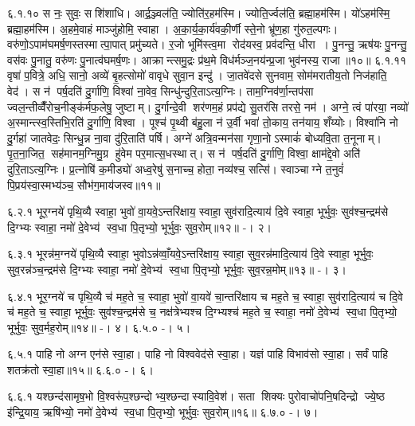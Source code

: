 ६.१.१०
स नः॒ सुवः॒ सशि॑शाधि। आर्द्र॒ञ्ज्वल॑ति॒ ज्योति॑र॒हम॑स्मि। ज्योति॒र्ज्वल॑ति॒ ब्रह्मा॒हम॑स्मि। यो॑ऽहम॑स्मि॒ ब्रह्मा॒हम॑स्मि। अ॒हमे॒वाहं माञ्जु॑होमि॒ स्वाहा। अ॒का॒र्य॒का॒र्य॑वकी॒र्णी स्ते॒नो भ्रू॑ण॒हा गु॑रुत॒ल्पगः। वरु॑णो॒ऽपाम॑घमर्\mbox{}ष॒णस्तस्मात्पा॒पात् प्रमु॑च्यते। र॒जो भूमि॑स्त्व॒मा रोद॑यस्व॒ प्रव॑दन्ति॒ धीरा। पु॒नन्तु॒ ऋष॑यः पु॒नन्तु॒ वस॑वः पु॒नातु॒ वरु॑णः पु॒नात्व॑घमर्\mbox{}ष॒णः। आक्रान्त्समु॒द्रः प्र॑थ॒मे विध॑र्मञ्ज॒नय॑न्प्र॒जा भुव॑नस्य॒ राजा॥१०॥
६.१.११
वृषा॑ प॒वित्रे॒ अधि॒ सानो॒ अव्ये॑ बृ॒हत्सोमो॑ वावृधे सुवा॒न इन्दु॑। जा॒तवे॑दसे सुनवाम॒ सोम॑मरातीय॒तो निज॑हाति॒ वेद॑। स न॑ पर्\mbox{}ष॒दति॑ दु॒र्गाणि॒ विश्वा॑ ना॒वेव॒ सिन्धु॑न्दुरि॒ताऽत्य॒ग्निः। ताम॒ग्निव॑र्णा॒न्तप॑सा ज्वल॒न्तीव्वैँ॑रोच॒नीङ्क॑र्मफ॒लेषु॒ जुष्टाम्। दु॒र्गान्दे॒वी शर॑णम॒हं प्रप॑द्ये सु॒तर॑सि तरसे॒ नम॑। अग्ने॒ त्वं पा॑रया॒ नव्यो॑ अ॒स्मान्त्स्व॒स्तिभि॒रति॑ दु॒र्गाणि॒ विश्वा। पूश्च॑ पृ॒थ्वी ब॑हु॒ला न॑ उ॒र्वी भवा॑ तो॒काय॒ तन॑याय॒ शँय्योः। विश्वा॑नि नो दु॒र्गहा॑ जातवेदः॒ सिन्धु॒न्न ना॒वा दु॑रि॒ताति॑ पर्\mbox{}षि। अग्ने॑ अत्रि॒वन्मन॑सा गृणा॒नोऽस्माकं॑ बोध्यवि॒ता त॒नूनाम्। पृ॒त॒ना॒जित॒ सह॑मानम॒ग्निमु॒ग्र हु॑वेम पर॒मात्स॒धस्थात्। स न॑ पर्\mbox{}ष॒दति॑ दु॒र्गाणि॒ विश्वा॒ क्षाम॑द्दे॒वो अति॑ दुरि॒ताऽत्य॒ग्निः। प्र॒त्नोषि॑ क॒मीड्यो॑ अध्व॒रेषु॑ स॒नाच्च॒ होता॒ नव्य॑श्च॒ सत्सि॑। स्वाञ्चाग्ने त॒नुवं॑ पि॒प्रय॑स्वा॒स्मभ्य॑ञ्च॒ सौभ॑ग॒माय॑जस्व॥११॥
\anuvakamend


६.२.१
भूर॒ग्नये॑ पृथि॒व्यै स्वाहा॒ भुवो॑ वा॒यवे॒ऽन्तरि॑क्षाय॒ स्वाहा॒ सुव॑रादि॒त्याय॑ दि॒वे स्वाहा॒ भूर्भुवः॒ सुव॑श्च॒न्द्रम॑से दि॒ग्भ्यः स्वाहा॒ नमो॑ दे॒वेभ्य॑ स्व॒धा पि॒तृभ्यो॒ भूर्भुवः॒ सुव॒रोम्॥१२॥ -। २।
\anuvakamend

६.३.१
भूरन्न॑म॒ग्नये॑ पृथि॒व्यै स्वाहा॒ भुवोऽन्न॑व्वाँ॒यवे॒ऽन्तरि॑क्षाय॒ स्वाहा॒ सुव॒रन्न॑मादि॒त्याय॑ दि॒वे स्वाहा॒ भूर्भुवः॒ सुव॒रन्न॑ञ्च॒न्द्रम॑से दि॒ग्भ्यः स्वाहा॒ नमो॑ दे॒वेभ्य॑ स्व॒धा पि॒तृभ्यो॒ भूर्भुवः॒ सुव॒रन्न॒मोम्॥१३॥ -। ३।
\anuvakamend

६.४.१
भूर॒ग्नये॑ च पृथि॒व्यै च॑ मह॒ते च॒ स्वाहा॒ भुवो॑ वा॒यवे॑ चा॒न्तरि॑क्षाय च मह॒ते च॒ स्वाहा॒ सुव॑रादि॒त्याय॑ च दि॒वे च॑ मह॒ते च॒ स्वाहा॒ भूर्भुवः॒ सुव॑श्च॒न्द्रम॑से च॒ नक्ष॑त्रेभ्यश्च दि॒ग्भ्यश्च॑ मह॒ते च॒ स्वाहा॒ नमो॑ दे॒वेभ्य॑ स्व॒धा पि॒तृभ्यो॒ भूर्भुवः॒ सुव॒र्मह॒रोम्॥१४॥ -। ४।
६.५.०
-। ५।
\anuvakamend

६.५.१
पाहि नो अग्न एन॑से स्वा॒हा। पाहि नो विश्ववेद॑से स्वा॒हा। यज्ञं पाहि विभाव॑सो स्वा॒हा। सर्वं पाहि शतक्र॑तो स्वा॒हा॥१५॥
६.६.०
-। ६।
\anuvakamend

६.६.१
यश्छन्द॑सामृष॒भो वि॒श्वरू॑प॒श्छन्दोभ्य॒श्छन्दास्यावि॒वेश॑। सता शिक्यः पुरोवाचो॑पनि॒षदिन्द्रो ज्ये॒ष्ठ इ॑न्द्रि॒याय॒ ऋषि॑भ्यो॒ नमो॑ दे॒वेभ्य॑ स्व॒धा पि॒तृभ्यो॒ भूर्भुवः॒ सुव॒रोम्॥१६॥
६.७.०
-। ७।
\anuvakamend

